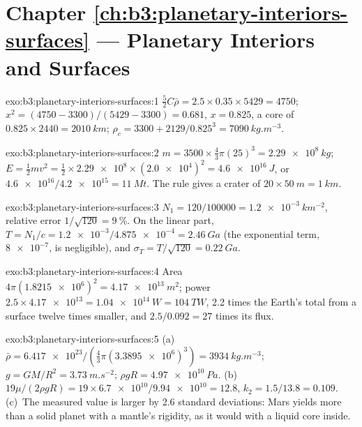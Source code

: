 \section*{Chapter \ref{ch:b3:planetary-interiors-surfaces} --- Planetary Interiors and Surfaces}

\begin{solution}{exo:b3:planetary-interiors-surfaces:1}
$\tfrac52C\bar\rho = 2.5\times0.35\times5429 = 4750$; $x^2 = (4750 -
3300)/(5429 - 3300) = 0.681$, $x = 0.825$, a core of $0.825\times2440 =
\qty{2010}{km}$; $\rho_c = 3300 + 2129/0.825^3 = \qty{7090}{kg.m^{-3}}$.
\end{solution}

\begin{solution}{exo:b3:planetary-interiors-surfaces:2}
$m = 3500\times\tfrac43\pi(25)^3 = \qty{2.29e8}{kg}$; $E = \tfrac12 m v^2 =
\tfrac12\times\num{2.29e8}\times(\num{2.0e4})^2 = \qty{4.6e16}{J}$, or
$\num{4.6e16}/\num{4.2e15} = \qty{11}{Mt}$. The rule gives a crater of
$20\times\qty{50}{m} = \qty{1}{km}$.
\end{solution}

\begin{solution}{exo:b3:planetary-interiors-surfaces:3}
$N_1 = 120/\num{100000} = \qty{1.2e-3}{km^{-2}}$, relative error $1/\sqrt{120}
= \qty{9}{\percent}$. On the linear part, $T = N_1/c = \num{1.2e-3}/\num{4.875e-4}
= \qty{2.46}{Ga}$ (the exponential term, $\num{8e-7}$, is negligible), and
$\sigma_T = T/\sqrt{120} = \qty{0.22}{Ga}$.
\end{solution}

\begin{solution}{exo:b3:planetary-interiors-surfaces:4}
Area $4\pi(\num{1.8215e6})^2 = \qty{4.17e13}{m^2}$; power $2.5\times
\num{4.17e13} = \qty{1.04e14}{W} = \qty{104}{TW}$, 2.2 times the Earth's
total from a surface twelve times smaller, and $2.5/0.092 = 27$ times its
flux.
\end{solution}

\begin{solution}{exo:b3:planetary-interiors-surfaces:5}
(a)~$\bar\rho = \num{6.417e23}/(\tfrac43\pi(\num{3.3895e6})^3) =
\qty{3934}{kg.m^{-3}}$; $g = GM/R^2 = \qty{3.73}{m.s^{-2}}$; $\rho gR =
\qty{4.97e10}{Pa}$. (b)~$19\mu/(2\rho gR) = 19\times\num{6.7e10}/\num{9.94e10}
= 12.8$, $k_2 = 1.5/13.8 = 0.109$. (c)~The measured value is larger by
2.6 standard deviations: Mars yields more than a solid planet with a
mantle's rigidity, as it would with a liquid core inside.
\end{solution}

